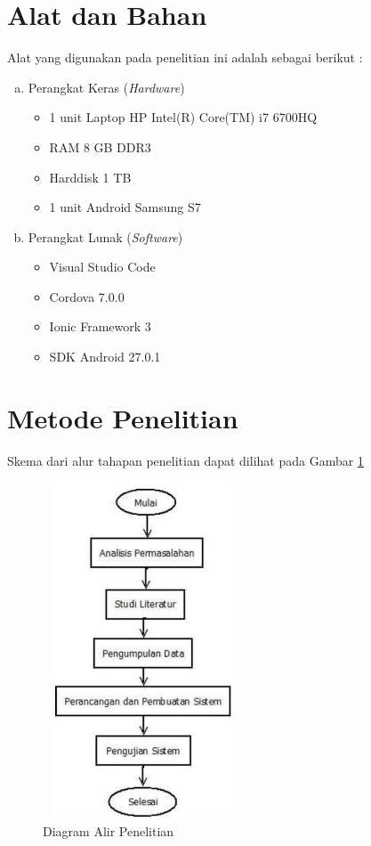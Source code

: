 \section{Alat dan Bahan}
Alat yang digunakan pada penelitian ini adalah sebagai berikut :

\begin{enumerate}[a.]
\item Perangkat Keras (\textit{Hardware})
	\begin{itemize}
		\item 1 unit Laptop HP Intel(R) Core(TM) i7 6700HQ
		\item RAM 8 GB DDR3
		\item Harddisk 1 TB
		\item 1 unit Android Samsung S7
	\end{itemize}

\item Perangkat Lunak (\textit{Software})
	\begin{itemize}
		\item Visual Studio Code
		\item Cordova 7.0.0
		\item Ionic Framework 3
		\item SDK Android 27.0.1
	\end{itemize}
\end{enumerate}

\section{Metode Penelitian}
Skema dari alur tahapan penelitian dapat dilihat pada Gambar \ref{alur}
\vspace{-0.4cm}
\begin{figure}[H]
	\center
	\includegraphics [width = 6cm, height= 10cm]{gambar/alur2}
	\caption{Diagram Alir Penelitian}
	\label{alur}
\end{figure}


